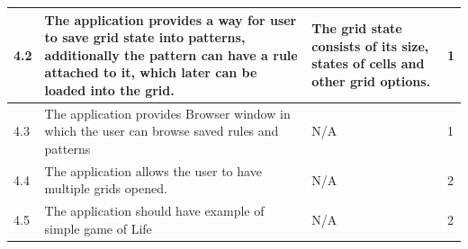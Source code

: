 \documentclass{article}
\begin{document}
\begin{center}
\begin{tabular}{| l | p{7cm} | p{5cm} | l |}
		4.2 & 
		The application provides a way for user to save grid state into patterns, additionally
		the pattern can have a rule attached to it, which later can be loaded into the grid.  & 
		
		The grid state consists of its size, states of cells and other grid options.&
		1
		\\ \hline				

		4.3 & 
		The application provides Browser window in which the 
		user can browse saved rules and patterns & 
		N/A &
		1 
		\\ \hline
	
		4.4 & 
		The application allows the user to have multiple grids opened. &
		N/A &
		2 
		\\ \hline
		4.5 & 
		The application should have example of simple game of Life &
		N/A &
		2 
		\\ \hline
	
	\end{tabular}

\end{center}

\newpage
\end{document}
